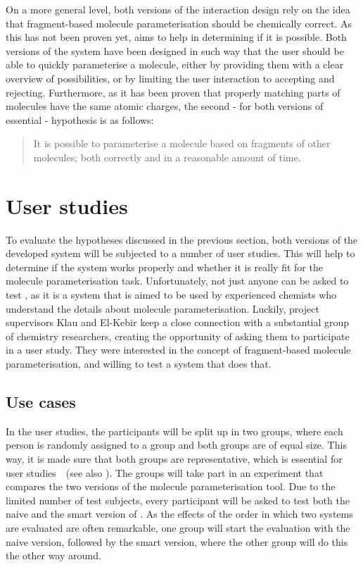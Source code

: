 On a more general level, both versions of the interaction design rely on the idea that fragment-based molecule parameterisation should be chemically correct. As this has not been proven yet, \oframp{} aims to help in determining if it is possible. Both versions of the system have been designed in such way that the user should be able to quickly parameterise a molecule, either by providing them with a clear overview of possibilities, or by limiting the user interaction to accepting and rejecting. Furthermore, as it has been proven that properly matching parts of molecules have the same atomic charges, the second - for both versions of \oframp{} essential - hypothesis is as follows:
\begin{quote}
It is possible to parameterise a molecule based on fragments of other molecules; both correctly and in a reasonable amount of time.
\end{quote}


\section{User studies}
To evaluate the hypotheses discussed in the previous section, both versions of the developed system will be subjected to a number of user studies. This will help to determine if the system works properly and whether it is really fit for the molecule parameterisation task. Unfortunately, not just anyone can be asked to test \oframp, as it is a system that is aimed to be used by experienced chemists who understand the details about molecule parameterisation. Luckily, project supervisors Klau and El-Kebir keep a close connection with a substantial group of chemistry researchers, creating the opportunity of asking them to participate in a user study. They were interested in the concept of fragment-based molecule parameterisation, and willing to test a system that does that.

\subsection{Use cases}
In the user studies, the participants will be split up in two groups, where each person is randomly assigned to a group and both groups are of equal size. This way, it is made sure that both groups are representative, which is essential for user studies~\cite{wohlin2003empirical}~(see also ). The groups will take part in an experiment that compares the two versions of the molecule parameterisation tool. Due to the limited number of test subjects, every participant will be asked to test both the naive and the smart version of \oframp. As the effects of the order in which two systems are evaluated are often remarkable, one group will start the evaluation with the naive version, followed by the smart version, where the other group will do this the other way around.

